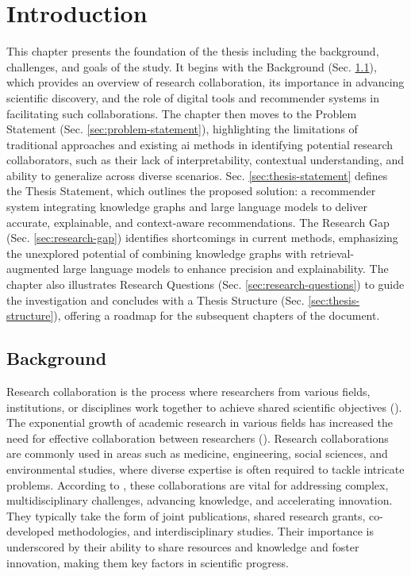 \chapter{Introduction}\label{chap:intro}

This chapter presents the foundation of the thesis including the background, challenges, and goals of the study.
It begins with the Background (Sec. \ref{sec:background}), which provides an overview of research collaboration, its importance in advancing scientific discovery, and the role of digital tools and recommender systems in facilitating such collaborations.
The chapter then moves to the Problem Statement (Sec. \ref{sec:problem-statement}), highlighting the limitations of traditional approaches and existing \gls{ai} methods in identifying potential research collaborators, such as their lack of interpretability, contextual understanding, and ability to generalize across diverse scenarios.
Sec. \ref{sec:thesis-statement} defines the Thesis Statement, which outlines the proposed solution: a recommender system integrating knowledge graphs and large language models to deliver accurate, explainable, and context-aware recommendations.
The Research Gap (Sec. \ref{sec:research-gap}) identifies shortcomings in current methods, emphasizing the unexplored potential of combining knowledge graphs with retrieval-augmented large language models to enhance precision and explainability.
The chapter also illustrates Research Questions (Sec. \ref{sec:research-questions}) to guide the investigation and concludes with a Thesis Structure (Sec. \ref{sec:thesis-structure}), offering a roadmap for the subsequent chapters of the document.

\section{Background}\label{sec:background}
Research collaboration is the process where researchers from various fields, institutions, or disciplines work together to achieve shared scientific objectives (\cite{KATZ19971}).
The exponential growth of academic research in various fields has increased the need for effective collaboration between researchers (\cite{Adams2012, Vermeulen2017}).
Research collaborations are commonly used in areas such as medicine, engineering, social sciences, and environmental studies, where diverse expertise is often required to tackle intricate problems.
According to \cite{Mei2021}, these collaborations are vital for addressing complex, multidisciplinary challenges, advancing knowledge, and accelerating innovation.
They typically take the form of joint publications, shared research grants, co-developed methodologies, and interdisciplinary studies.
Their importance is underscored by their ability to share resources and knowledge and foster innovation, making them key factors in scientific progress.

